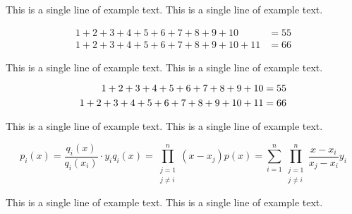 This is a single line of example text. This is a single line of example text.

\begin{align}
	1 + 2 + 3 + 4 + 5 + 6 + 7 + 8 + 9 + 10 &= 55  \\
	1 + 2 + 3 + 4 + 5 + 6 + 7 + 8 + 9 + 10 + 11 &= 66
\end{align}

This is a single line of example text. This is a single line of example text.

\begin{align}
	\notag\\[-6mm]
	\begin{split}
		1 + 2 + 3 + 4 + 5 + 6 + 7 + 8 + 9 + 10 &= 55  \\
		1 + 2 + 3 + 4 + 5 + 6 + 7 + 8 + 9 + 10 + 11 &= 66
	\end{split}\\[-6mm]\notag
\end{align}

This is a single line of example text. This is a single line of example text.

\begin{subequations}
	\begin{equation}
		p_i(x) = \frac{q_i(x)}{q_i(x_i)} \cdot y_i
	\end{equation}
	
	\begin{equation}
		q_i(x) = \prod_{\substack{j=1 \\ j \ne i}}^n (x - x_j)
	\end{equation}
	
	\begin{equation}
		p(x) = \sum_{i=1}^n \prod_{\substack{j=1 \\ j \ne i}}^n \frac{x - x_i}{x_j - x_i} y_i
	\end{equation}
\end{subequations}

This is a single line of example text. This is a single line of example text.
